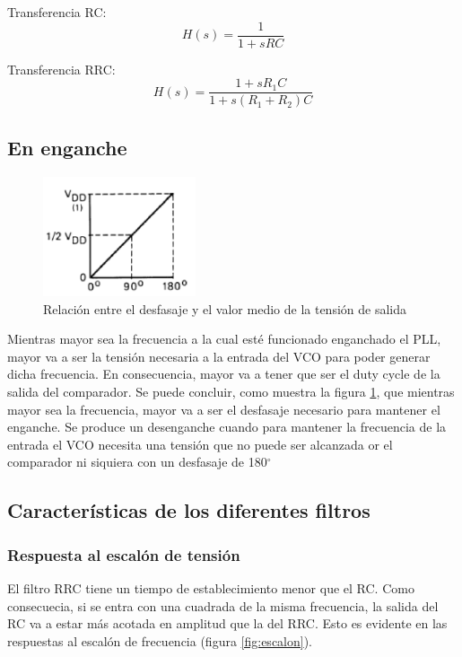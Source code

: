 \documentclass[../../tc_tp6_main.tex]{subfiles}
\begin{document}
Transferencia RC:
\[H(s) = \frac{1}{1+sRC}\]

Transferencia RRC:
\[H(s) = \frac{1+ sR_1C}{1+s(R_1+R_2)C}\]


\subsection{En enganche}

\begin{figure}
	\centering
	\includegraphics[width = 0.4\textwidth]{figures/fase_lineal.png}
	\caption{Relaci\'on entre el desfasaje y el valor medio de la tensi\'on de salida}
	\label{fase_lineal}
\end{figure}

Mientras mayor sea la frecuencia a la cual est\'e funcionado enganchado el PLL, mayor va a ser la tensi\'on necesaria a la entrada del VCO para poder generar dicha frecuencia. En consecuencia, mayor va a tener que ser el duty cycle de la salida del comparador. Se puede concluir, como muestra la figura \ref{fase_lineal}, que mientras mayor sea la frecuencia, mayor va a ser el desfasaje necesario para mantener el enganche. Se produce un desenganche cuando para mantener la frecuencia de la entrada el VCO necesita una tensi\'on que no puede ser alcanzada or el comparador ni siquiera con un desfasaje de 180$^\circ$

\subsection{Caracter\'isticas de los diferentes filtros}

\subsubsection{Respuesta al escal\'on de tensi\'on}
El filtro RRC tiene un tiempo de establecimiento menor que el RC. Como consecuecia, si se entra con una cuadrada de la misma frecuencia, la salida del RC va a estar m\'as acotada en amplitud que la del RRC. Esto es evidente en las respuestas al escal\'on de frecuencia (figura \ref{fig:escalon}).
\end{document}
